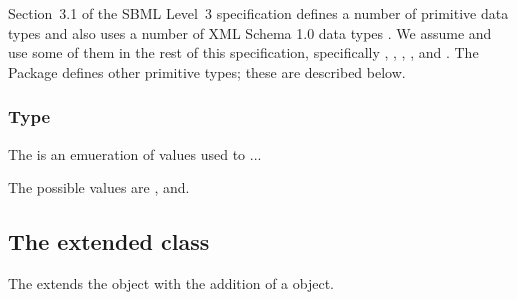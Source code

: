 Section~3.1 of the SBML Level~3 specification defines a number of
primitive data types and also uses a number of XML Schema 1.0 data types
\citep{biron:2000}. We assume and use some of them in the rest of this
specification, specifically , ,
, , and . The \Groups
Package defines other primitive types; these are described below.


\subsubsection{Type \fixttspace{}}



The  is an emueration of values used to ...

The possible values are ,
and.

\subsection{The extended  class}
\label{model-class}




The \GroupsPackage extends the  object with the addition of
a \ListOfGroups object.

